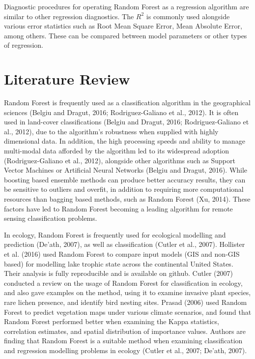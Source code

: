 \documentclass[
]{article}
\begin{document}
Diagnostic procedures for operating Random Forest as a regression algorithm are similar to other regression diagnostics. The \(R^2\) is commonly used alongside various error statistics such as Root Mean Square Error, Mean Absolute Error, among others. These can be compared between model parameters or other types of regression.

\hypertarget{literature-review}{%
\section{Literature Review}\label{literature-review}}

Random Forest is frequently used as a classification algorithm in the geographical sciences (Belgiu and Dragut, 2016; Rodriguez-Galiano et al., 2012). It is often used in land-cover classifications (Belgiu and Dragut, 2016; Rodriguez-Galiano et al., 2012), due to the algorithm's robustness when supplied with highly dimensional data. In addition, the high processing speeds and ability to manage multi-modal data afforded by the algorithm led to its widespread adoption (Rodriguez-Galiano et al., 2012), alongside other algorithms such as Support Vector Machines or Artificial Neural Networks (Belgiu and Dragut, 2016). While boosting based ensemble methods can produce better accuracy results, they can be sensitive to outliers and overfit, in addition to requiring more computational resources than bagging based methods, such as Random Forest (Xu, 2014). These factors have led to Random Forest becoming a leading algorithm for remote sensing classification problems.

In ecology, Random Forest is frequently used for ecological modelling and prediction (De'ath, 2007), as well as classification (Cutler et al., 2007). Hollister et al. (2016) used Random Forest to compare input models (GIS and non-GIS based) for modelling lake trophic state across the continental United States. Their analysis is fully reproducible and is available on github. Cutler (2007) conducted a review on the usage of Random Forest for classification in ecology, and also gave examples on the method, using it to examine invasive plant species, rare lichen presence, and identify bird nesting sites. Prasad (2006) used Random Forest to predict vegetation maps under various climate scenarios, and found that Random Forest performed better when examining the Kappa statistics, correlation estimates, and spatial distribution of importance values. Authors are finding that Random Forest is a suitable method when examining classification and regression modelling problems in ecology (Cutler et al., 2007; De'ath, 2007).
\end{document}
